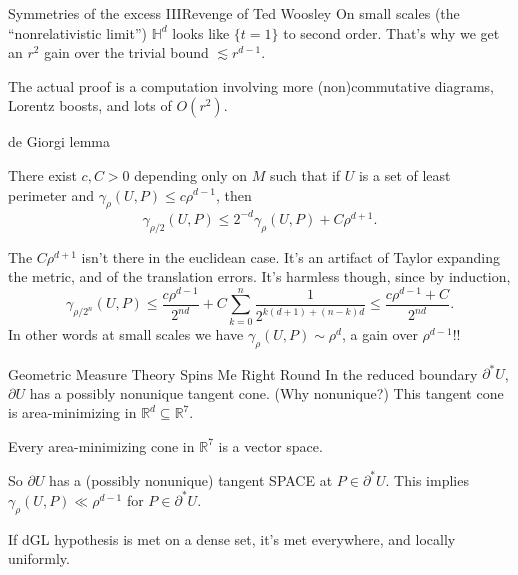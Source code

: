 \documentclass[10pt]{beamer}
\newcommand{\RR}{\mathbb{R}}
\begin{document}
\begin{frame}{Symmetries of the excess III}{Revenge of Ted Woosley}
    On small scales (the ``nonrelativistic limit'') $\mathbb H^d$ looks like $\{t = 1\}$ to second order.
    That's why we get an $r^2$ gain over the trivial bound $\lesssim r^{d - 1}$.

    The actual proof is a computation involving more (non)commutative diagrams, Lorentz boosts, and lots of $O(r^2)$.
\end{frame}

\begin{frame}{de Giorgi lemma}
\begin{theorem}
There exist $c, C > 0$ depending only on $M$ such that if $U$ is a set of least perimeter and $\gamma_\rho(U, P) \leq c\rho^{d - 1}$, then 
$$\gamma_{\rho/2}(U, P) \leq 2^{-d} \gamma_\rho(U, P) + C\rho^{d + 1}.$$
\end{theorem}\pause

The $C\rho^{d + 1}$ isn't there in the euclidean case. It's an artifact of Taylor expanding the metric, and of the translation errors.\pause
It's harmless though, since by induction,
$$\gamma_{\rho/2^n}(U, P) \leq \frac{c\rho^{d - 1}}{2^{nd}} + C\sum_{k=0}^n \frac{1}{2^{k(d + 1) + (n - k)d}} \leq \frac{c\rho^{d - 1} + C}{2^{nd}}.$$\pause
In other words at small scales we have $\gamma_\rho(U, P) \sim \rho^d$, a gain over $\rho^{d - 1}$!!
\end{frame}

\begin{frame}{Geometric Measure Theory Spins Me Right Round}
    In the reduced boundary $\partial^* U$, $\partial U$ has a possibly nonunique tangent cone. \pause (Why nonunique?) \pause
    This tangent cone is area-minimizing in $\RR^d \subseteq \RR^7$.

    \begin{theorem}[Fleming? '60s]
    Every area-minimizing cone in $\RR^7$ is a vector space.
    \end{theorem}\pause
    
    So $\partial U$ has a (possibly nonunique) tangent SPACE at $P \in \partial^* U$.
    This implies $\gamma_\rho(U, P) \ll \rho^{d - 1}$ for $P \in \partial^* U$.\pause

    If dGL hypothesis is met on a dense set, it's met everywhere, and locally uniformly.
\end{frame}
\end{document}
